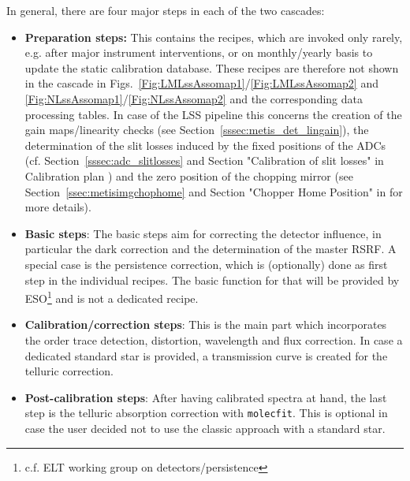 In general, there are four major steps in each of the two cascades:
\begin{itemize}
    \item \textbf{Preparation steps:} This contains the recipes, which are invoked only rarely, e.g. after major instrument interventions, or on monthly/yearly basis to update the static calibration database. These recipes are therefore not shown in the cascade in Figs.~\ref{Fig:LMLssAssomap1}/\ref{Fig:LMLssAssomap2} and \ref{Fig:NLssAssomap1}/\ref{Fig:NLssAssomap2} and the corresponding data processing tables. In case of the \ac{LSS} pipeline this concerns the creation of the gain maps/linearity checks (see Section~\ref{sssec:metis_det_lingain}), the determination of the slit losses induced by the fixed positions of the ADCs (cf. Section~\ref{sssec:adc_slitlosses} and Section "Calibration of slit losses" in Calibration plan \cite{METIS-calibration_plan}) and the zero position of the chopping mirror (see Section~\ref{ssec:metisimgchophome} and Section "Chopper Home Position" in \cite{METIS-calibration_plan} for more details). 
    \item \textbf{Basic steps}: The basic steps aim for correcting the detector influence, in particular the dark correction and the determination of the master \ac{RSRF}. A special case is the persistence correction, which is (optionally) done as first step in the individual recipes. The basic function for that will be provided by \ac{ESO}\footnote{c.f. \ac{ELT} working group on detectors/persistence} and is not a dedicated recipe. 
    \item \textbf{Calibration/correction steps}: This is the main part which incorporates the order trace detection, distortion, wavelength and flux correction. In case a dedicated standard star is provided, a transmission curve is created for the telluric correction.
    \item \textbf{Post-calibration steps}: After having calibrated spectra at hand, the last step is the telluric absorption correction with \texttt{molecfit}. This is optional in case the user decided not to use the classic approach with a standard star.
\end{itemize}

